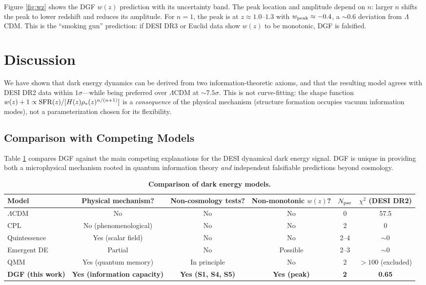 \documentclass[12pt,a4paper]{article}
\begin{document}
Figure \ref{fig:wz} shows the DGF $w(z)$ prediction with its uncertainty band. The peak location and amplitude depend on $n$: larger $n$ shifts the peak to lower redshift and reduces its amplitude. For $n=1$, the peak is at $z\approx1.0$--$1.3$ with $w_{\rm peak}\approx-0.4$, a $\sim0.6$ deviation from $\Lambda$CDM. This is the ``smoking gun'' prediction: if DESI DR3 or Euclid data show $w(z)$ to be monotonic, DGF is falsified.

\section{Discussion}

We have shown that dark energy dynamics can be derived from two information-theoretic axioms, and that the resulting model agrees with DESI DR2 data within $1\sigma$---while being preferred over $\Lambda$CDM at $\sim7.5\sigma$. This is not curve-fitting: the shape function $w(z)+1\propto{\rm SFR}(z)/[H(z)\rho_*(z)^{n/(n+1)}]$ is a {\it consequence} of the physical mechanism (structure formation occupies vacuum information modes), not a parameterization chosen for its flexibility.

\subsection{Comparison with Competing Models}

Table \ref{tab:competitors} compares DGF against the main competing explanations for the DESI dynamical dark energy signal. DGF is unique in providing both a microphysical mechanism rooted in quantum information theory {\it and} independent falsifiable predictions beyond cosmology.

\begin{table}[htbp]
\centering
\caption{\bf Comparison of dark energy models.}
\label{tab:competitors}
\begin{tabular}{lccccc}
\toprule
Model & Physical mechanism? & Non-cosmology tests? & Non-monotonic $w(z)$? & $N_{\rm par}$ & $\chi^2$ (DESI DR2) \\
\midrule
$\Lambda$CDM & No & No & No & 0 & 57.5 \\
CPL & No (phenomenological) & No & No & 2 & 0 \\
Quintessence & Yes (scalar field) & No & No & 2--4 & $\sim$0 \\
Emergent DE \cite{li2024} & Partial & No & Possible & 2--3 & $\sim$0 \\
QMM \cite{neukart2025} & Yes (quantum memory) & In principle & No & 2 & $>100$ (excluded) \\
{\bf DGF (this work)} & {\bf Yes (information capacity)} & {\bf Yes (S1, S4, S5)} & {\bf Yes (peak)} & {\bf 2} & {\bf 0.65} \\
\bottomrule
\end{tabular}
\end{table}
\end{document}
